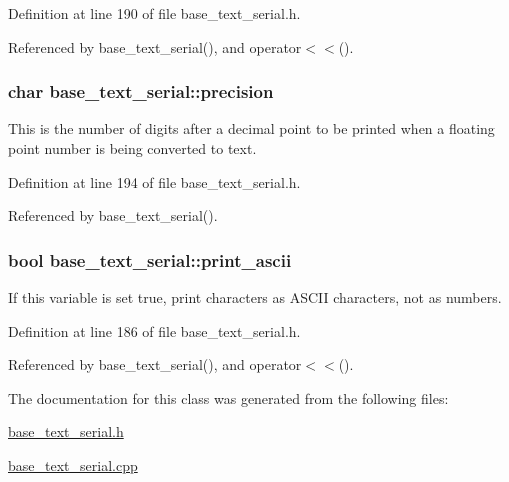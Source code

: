 Definition at line 190 of file base\-\_\-text\-\_\-serial.\-h.



Referenced by base\-\_\-text\-\_\-serial(), and operator$<$$<$().

\hypertarget{classbase__text__serial_a0927f9b976981a7f38a4445083ec6f34}{
\subsubsection[{precision}]{\setlength{\rightskip}{0pt plus 5cm}char base\-\_\-text\-\_\-serial\-::precision\hspace{0.3cm}{\ttfamily [protected]}}}\label{classbase__text__serial_a0927f9b976981a7f38a4445083ec6f34}
This is the number of digits after a decimal point to be printed when a floating point number is being converted to text. 

Definition at line 194 of file base\-\_\-text\-\_\-serial.\-h.



Referenced by base\-\_\-text\-\_\-serial().

\hypertarget{classbase__text__serial_acf570e2dd8b2f818f2728c22945f1955}{
\subsubsection[{print\-\_\-ascii}]{\setlength{\rightskip}{0pt plus 5cm}bool base\-\_\-text\-\_\-serial\-::print\-\_\-ascii\hspace{0.3cm}{\ttfamily [protected]}}}\label{classbase__text__serial_acf570e2dd8b2f818f2728c22945f1955}
If this variable is set true, print characters as A\-S\-C\-I\-I characters, not as numbers. 

Definition at line 186 of file base\-\_\-text\-\_\-serial.\-h.



Referenced by base\-\_\-text\-\_\-serial(), and operator$<$$<$().



The documentation for this class was generated from the following files\-:\begin{DoxyCompactItemize}
\item 
\hyperlink{base__text__serial_8h}{base\-\_\-text\-\_\-serial.\-h}\item 
\hyperlink{base__text__serial_8cpp}{base\-\_\-text\-\_\-serial.\-cpp}\end{DoxyCompactItemize}
